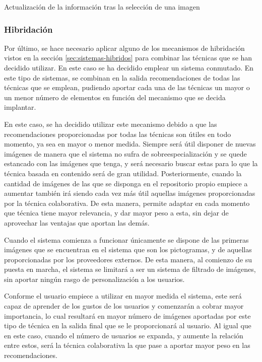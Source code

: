 \newpage




Actualización de la información tras la selección de una imagen
\subsubsection{Hibridación}


Por último, se hace necesario aplicar alguno de los mecanismos de hibridación vistos en la sección \ref{sec:sistemas-hibridos} para combinar las técnicas que se han decidido utilizar. En este caso se ha decidido emplear un sistema conmutado. En este tipo de sistemas, se combinan en la salida recomendaciones de todas las técnicas que se emplean, pudiendo aportar cada una de las técnicas un mayor o un menor número de elementos en función del mecanismo que se decida implantar.

En este caso, se ha decidido utilizar este mecanismo debido a que las recomendaciones proporcionadas por todas las técnicas son útiles en todo momento, ya sea en mayor o menor medida. Siempre será útil disponer de nuevas imágenes de manera que el sistema no sufra de sobreespecialización y se quede estancado con las imágenes que tenga, y será necesario buscar estas para lo que la técnica basada en contenido será de gran utilidad. Posteriormente, cuando la cantidad de imágenes de las que se disponga en el repositorio propio empiece a aumentar también irá siendo cada vez más útil aquellas imágenes proporcionadas por la técnica colaborativa. De esta manera, permite adaptar en cada momento que técnica tiene mayor relevancia, y dar mayor peso a esta, sin dejar de aprovechar las ventajas que aportan las demás. 

Cuando el sistema comienza a funcionar únicamente se dispone de las primeras imágenes que se encuentran en el sistema que son los pictogramas, y de aquellas proporcionadas por los proveedores externos. De esta manera, al comienzo de su puesta en marcha, el sistema se limitará a ser un sistema de filtrado de imágenes, sin aportar ningún rasgo de personalización a los usuarios.

Conforme el usuario empiece a utilizar en mayor medida el sistema, este será capaz de aprender de los gustos de los usuarios y comenzarán a cobrar mayor importancia, lo cual resultará en mayor número de imágenes aportadas por este tipo de técnica en la salida final que se le proporcionará al usuario. Al igual que en este caso, cuando el número de usuarios se expanda, y aumente la relación entre estos, será la técnica colaborativa la que pase a aportar mayor peso en las recomendaciones.



